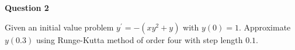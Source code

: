 

\begin{tcolorbox}
\textbf{Question 2} 


Given an initial value problem $y^{\prime}=-\left(x y^{2}+y\right)$ with $y(0)=1$. Approximate $y(0.3)$ using Runge-Kutta method of order four with step length $0.1$.




\end{tcolorbox}

\begin{solution}\ \\











\end{solution}
